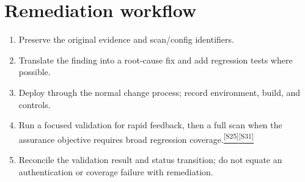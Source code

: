 \documentclass[11pt,letterpaper,oneside]{scrreprt}
\newcommand{\src}[1]{\hyperref[src:#1]{\textsuperscript{\color{R7Orange}[#1]}}}
\begin{document}
\section{Remediation workflow}
\begin{enumerate}
  \item Preserve the original evidence and scan/config identifiers.
  \item Translate the finding into a root-cause fix and add regression tests where possible.
  \item Deploy through the normal change process; record environment, build, and controls.
  \item Run a focused validation for rapid feedback, then a full scan when the assurance objective requires broad regression coverage.\src{S25}\src{S31}
  \item Reconcile the validation result and status transition; do not equate an authentication or coverage failure with remediation.
\end{enumerate}
\end{document}
